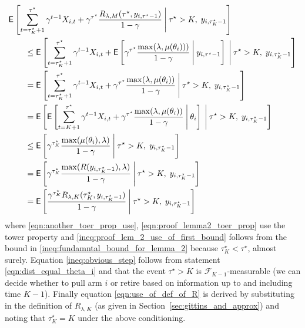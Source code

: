 \begin{myproof}[Proof.]
	\begin{align} 
	&\E\left[\sum_{t=\tau_K^\star+1}^{\tau^\star} \gamma^{t-1} X_{i,t} + \gamma^{\tau^\star} \frac{R_{\lambda,M}(\tau^\star, y_{i,\tau^\star-1})}{1-\gamma}
	\given[\Bigg] \tau^\star > K, \;y_{i,\tau^\star_K-1} \right] \nonumber \\
	&\qquad \le  \E\left[\sum_{t=\tau_K^\star+1}^{\tau^\star} \gamma^{t-1} X_{i,t} +  \Ee{ \gamma^{\tau^\star}\frac{\max(\lambda,\mu(\theta_i)))}{1-\gamma}\given[\Bigg] y_{i,\tau^\star-1}}
	\given[\Bigg] \tau^\star > K, \;y_{i,\tau^\star_K-1} \right] \nonumber\\
	&\qquad = \E\left[\sum_{t=\tau_K^\star+1}^{\tau^\star} \gamma^{t-1} X_{i,t} + \gamma^{\tau^\star} \frac{\max(\lambda, \mu(\theta_i))}{1-\gamma}
	\given[\Bigg] \tau^\star > K, \;y_{i,\tau^\star_K-1} \right] \label{eqn:another_toer_prop_use}\\
	&\qquad = \E\left[ \Ee{\sum_{t=K+1}^{\tau^\star} \gamma^{t-1} X_{i,t} + \gamma^{\tau^\star}\frac{\max(\lambda,\mu(\theta_i))}{1 - \gamma} \given[\Bigg] \theta_i} 
	\given[\Bigg]\tau^\star > K, \; y_{i,\tau^\star_K-1} \right] \label{eqn:proof_lemma2_toer_prop} \\
	&\qquad \le \E\left[ \gamma^{\tau^\star_K} \frac{\max(\mu(\theta_i), \lambda)}{1 - \gamma}\given[\Bigg] \tau^\star > K, \; y_{i,\tau^\star_K-1}  \right]  \label{ineq:proof_lem_2_use_of_first_bound} \\
	&\qquad = \E\left[ \gamma^{\tau^\star_K} \frac{\max(R(y_{i,\tau^\star_K-1}), \lambda)}{1 - \gamma}\given[\Bigg] \tau^\star > K, \; y_{i,\tau^\star_K-1}  \right]  \label{ineq:obvious_step} \\
	&\qquad = \Ee{\frac{\gamma^{\tau^\star_K}R_{\lambda,K}(\tau^\star_K, y_{i,\tau^\star_K-1})}{1-\gamma} \given[\Bigg]  \tau^\star > K, \; y_{i,\tau^\star_K-1}} \label{eqn:use_of_def_of_R}
	\end{align}
	where \eqref{eqn:another_toer_prop_use}, \eqref{eqn:proof_lemma2_toer_prop} use the tower property and \eqref{ineq:proof_lem_2_use_of_first_bound} follows from the bound in \eqref{ineq:fundamntal_bound_for_lemma_2} because $\tau^\star_K < \tau^\star$, almost surely. Equation \eqref{ineq:obvious_step} follows from statement \eqref{eqn:dist_equal_theta_i} and that the event $\tau^\star > K$ is $\mathcal{F}_{K-1}$-measurable (we can decide whether to pull arm $i$ or retire based on information up to and including time $K-1$). Finally equation \eqref{eqn:use_of_def_of_R} is derived by substituting in the definition of $R_{\lambda,K}$ (as given in Section~\ref{sec:gittins_and_approx}) and noting that $\tau^\star_K = K$ under the above conditioning.
	

\end{myproof}
